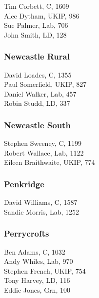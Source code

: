 \documentclass[a4paper,openany,10pt]{book}
\begin{document}


Tim Corbett, C, 1609\\
Alec Dytham, UKIP, 986\\
Sue Palmer, Lab, 706\\
John Smith, LD, 128\\


\subsubsection*{Newcastle Rural}



David Loades, C, 1355\\
Paul Somerfield, UKIP, 827\\
Daniel Walker, Lab, 457\\
Robin Studd, LD, 337\\


\subsubsection*{Newcastle South}



Stephen Sweeney, C, 1199\\
Robert Wallace, Lab, 1122\\
Eileen Braithwaite, UKIP, 774\\


\subsubsection*{Penkridge}



David Williams, C, 1587\\
Sandie Morris, Lab, 1252\\


\subsubsection*{Perrycrofts}



Ben Adams, C, 1032\\
Andy Whiles, Lab, 970\\
Stephen French, UKIP, 754\\
Tony Harvey, LD, 116\\
Eddie Jones, Grn, 100\\
\end{document}
